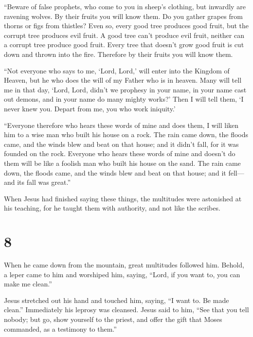  ``Beware of false prophets, who come to you in sheep's
clothing, but inwardly are ravening wolves.  By their
fruits you will know them. Do you gather grapes from thorns or figs from
thistles?  Even so, every good tree produces good fruit,
but the corrupt tree produces evil fruit.  A good tree
can't produce evil fruit, neither can a corrupt tree produce good fruit.
 Every tree that doesn't grow good fruit is cut down and
thrown into the fire.  Therefore by their fruits you will
know them.

 ``Not everyone who says to me, `Lord, Lord,' will enter
into the Kingdom of Heaven, but he who does the will of my Father who is
in heaven.  Many will tell me in that day, `Lord, Lord,
didn't we prophesy in your name, in your name cast out demons, and in
your name do many mighty works?'  Then I will tell them,
`I never knew you. Depart from me, you who work iniquity.'

 ``Everyone therefore who hears these words of mine and
does them, I will liken him to a wise man who built his house on a rock.
 The rain came down, the floods came, and the winds blew
and beat on that house; and it didn't fall, for it was founded on the
rock.  Everyone who hears these words of mine and doesn't
do them will be like a foolish man who built his house on the sand.
 The rain came down, the floods came, and the winds blew
and beat on that house; and it fell---and its fall was great.''

 When Jesus had finished saying these things, the
multitudes were astonished at his teaching,  for he
taught them with authority, and not like the scribes.

\hypertarget{section-7}{%
\section{8}\label{section-7}}

 When he came down from the mountain, great multitudes
followed him.  Behold, a leper came to him and worshiped
him, saying, ``Lord, if you want to, you can make me clean.''

 Jesus stretched out his hand and touched him, saying, ``I
want to. Be made clean.'' Immediately his leprosy was cleansed.
 Jesus said to him, ``See that you tell nobody; but go,
show yourself to the priest, and offer the gift that Moses commanded, as
a testimony to them.''

